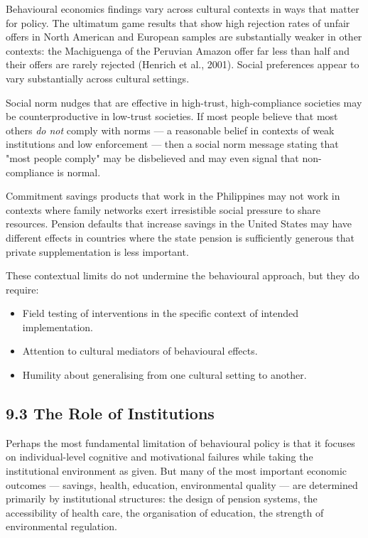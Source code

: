 \documentclass[12pt, letterpaper]{article}
\begin{document}
Behavioural economics findings vary across cultural contexts in ways that matter for policy. The ultimatum game results that show high rejection rates of unfair offers in North American and European samples are substantially weaker in other contexts: the Machiguenga of the Peruvian Amazon offer far less than half and their offers are rarely rejected (Henrich et al., 2001). Social preferences appear to vary substantially across cultural settings.

Social norm nudges that are effective in high-trust, high-compliance societies may be counterproductive in low-trust societies. If most people believe that most others \textit{do not} comply with norms --- a reasonable belief in contexts of weak institutions and low enforcement --- then a social norm message stating that "most people comply" may be disbelieved and may even signal that non-compliance is normal.

Commitment savings products that work in the Philippines may not work in contexts where family networks exert irresistible social pressure to share resources. Pension defaults that increase savings in the United States may have different effects in countries where the state pension is sufficiently generous that private supplementation is less important.

These contextual limits do not undermine the behavioural approach, but they do require:
\begin{itemize}
\item Field testing of interventions in the specific context of intended implementation.
\item Attention to cultural mediators of behavioural effects.
\item Humility about generalising from one cultural setting to another.
\end{itemize}


\subsection{9.3 The Role of Institutions}


Perhaps the most fundamental limitation of behavioural policy is that it focuses on individual-level cognitive and motivational failures while taking the institutional environment as given. But many of the most important economic outcomes --- savings, health, education, environmental quality --- are determined primarily by institutional structures: the design of pension systems, the accessibility of health care, the organisation of education, the strength of environmental regulation.
\end{document}
